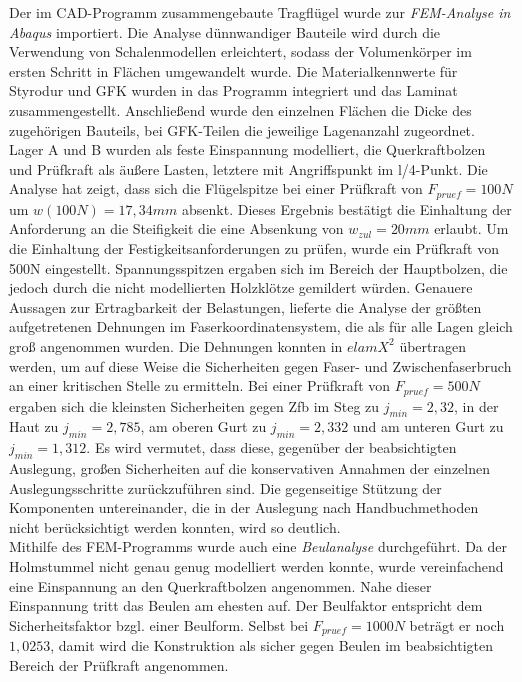 \noindent Der im CAD-Programm zusammengebaute Tragflügel wurde zur \textit{FEM-Analyse in Abaqus} importiert. Die Analyse dünnwandiger Bauteile wird durch die Verwendung von Schalenmodellen erleichtert, sodass der Volumenkörper im ersten Schritt in Flächen umgewandelt wurde. Die Materialkennwerte für Styrodur und GFK wurden in das Programm integriert und das Laminat zusammengestellt. Anschließend wurde den einzelnen Flächen die Dicke des zugehörigen Bauteils, bei GFK-Teilen die jeweilige Lagenanzahl zugeordnet. Lager A und B wurden als feste Einspannung modelliert, die Querkraftbolzen und Prüfkraft als äußere Lasten, letztere mit Angriffspunkt im l/4-Punkt. Die Analyse hat zeigt, dass sich die Flügelspitze bei einer Prüfkraft von $ F_{pruef}=100N $ um $ w(100N)=17,34mm $ absenkt. Dieses Ergebnis bestätigt die Einhaltung der Anforderung an die Steifigkeit die eine Absenkung von $ w_{zul}=20mm $ erlaubt. Um die Einhaltung der Festigkeitsanforderungen zu prüfen, wurde ein Prüfkraft von 500N eingestellt. Spannungsspitzen ergaben sich im Bereich der Hauptbolzen, die jedoch durch die nicht modellierten Holzklötze gemildert würden. Genauere Aussagen zur Ertragbarkeit der Belastungen, lieferte die Analyse der größten aufgetretenen Dehnungen im Faserkoordinatensystem, die als für alle Lagen gleich groß angenommen wurden. Die Dehnungen konnten in $elamX^{2}$ übertragen werden, um auf diese Weise die Sicherheiten gegen Faser- und Zwischenfaserbruch an einer kritischen Stelle zu ermitteln. Bei einer Prüfkraft von $ F_{pruef}=500N $ ergaben sich die kleinsten Sicherheiten gegen Zfb im Steg zu $ j_{min}=2,32 $, in der Haut zu $ j_{min}=2,785 $, am oberen Gurt zu $ j_{min}=2,332 $ und am unteren Gurt zu $ j_{min} =1,312$. Es wird vermutet, dass diese, gegenüber der beabsichtigten Auslegung, großen Sicherheiten auf die konservativen Annahmen der einzelnen Auslegungsschritte zurückzuführen sind. Die gegenseitige Stützung der Komponenten untereinander, die in der Auslegung nach Handbuchmethoden nicht berücksichtigt werden konnten, wird so deutlich.\\

\noindent Mithilfe des FEM-Programms wurde auch eine \textit{Beulanalyse} durchgeführt. Da der Holmstummel nicht genau genug modelliert werden konnte, wurde vereinfachend eine Einspannung an den Querkraftbolzen angenommen. Nahe dieser Einspannung tritt das Beulen am ehesten auf. Der Beulfaktor entspricht dem Sicherheitsfaktor bzgl. einer Beulform. Selbst bei $ F_{pruef}=1000N $ beträgt er noch $ 1,0253 $, damit wird die Konstruktion als sicher gegen Beulen im beabsichtigten Bereich der Prüfkraft angenommen.\\

